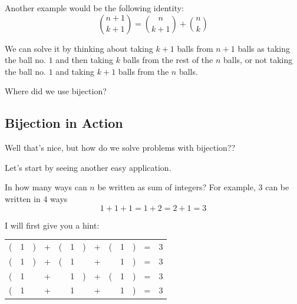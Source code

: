 \documentclass[compress]{beamer}
\begin{document}
\begin{frame}
    Another example would be the following identity:
    \[{n+1 \choose k+1} = {n \choose k+1} + {n \choose k}\]

    \pause\vspace{1em}

    We can solve it by thinking about taking $k+1$ balls from $n+1$ balls as
    taking the ball no. $1$ and then taking $k$ balls from the rest of the
    $n$ balls, or not taking the ball no. $1$ and taking $k+1$ balls from the
    $n$ balls.

    \pause\vspace{1em}

    Where did we use bijection?  
\end{frame}


\subsection{Bijection in Action}

\begin{frame}
    Well that's nice, but how do we solve problems with bijection??

    \pause\vspace{1em}

    Let's start by seeing another easy application.
\end{frame}

\begin{frame}
    \textcolor{NordOrange}{
        In how many ways can $n$ be written as sum of
        integers? For example, $3$ can be written in $4$ ways
        \[1 + 1+ 1 = 1+2 = 2 + 1 = 3\] 
    }

    \pause\vspace{1em}

    I will first give you a hint:

    \vspace{1em}

    \begin{center}
        \begin{tabular}{ccccccccccccc}
            ( & 1 & )& +  & ( & 1 & ) &+& ( & 1 & ) & = & 3\\
            ( & 1 & ) &+& ( & 1 & & +& & 1 & ) & = & 3\\
            ( & 1 &  & +& & 1 & ) &+ & ( & 1 & ) & = & 3\\
            ( & 1 &  & +& & 1 &  & +& & 1 & ) & = & 3\\
        \end{tabular}
    \end{center}
\end{frame}
\end{document}
